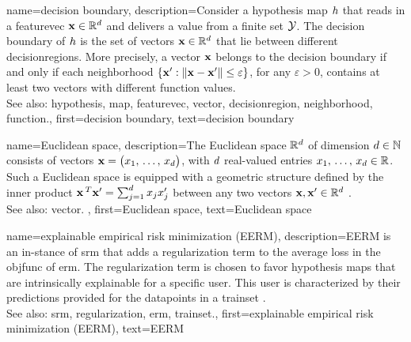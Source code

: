{name={decision boundary}, 
	description={Consider a 
		\gls{hypothesis} \gls{map} $h$ that reads in a \gls{featurevec}  
		${\bf x} \in \mathbb{R}^{d}$ and delivers a value from a finite set $\mathcal{Y}$. 
		The decision boundary of $h$ is the set of \glspl{vector} ${\bf x} \in \mathbb{R}^{d}$ 
		that lie between different \glspl{decisionregion}. More precisely, a 
		\gls{vector} ${\bf x}$ belongs to the decision boundary if and only 
		if each \gls{neighborhood} $\{ {\bf x}': \| {\bf x} - {\bf x}' \| \leq \varepsilon \}$, 
		for any $\varepsilon >0$, contains at least two \glspl{vector} with different \gls{function} values.
				\\
		See also: \gls{hypothesis}, \gls{map}, \gls{featurevec}, \gls{vector}, \gls{decisionregion}, \gls{neighborhood}, \gls{function}.},
	first={decision boundary},
	text={decision boundary} 
}


{name={Euclidean space}, 
	description={The 
		Euclidean space $\mathbb{R}^{d}$ of dimension $d \in \mathbb{N}$ consists 
		of \glspl{vector} ${\bf x}= \big(x_{1}, \,\ldots, \,x_{d}\big)$, with $d$ 
		real-valued entries $x_{1}, \,\ldots, \,x_{d} \in \mathbb{R}$. Such a Euclidean 
		space is equipped with a geometric structure defined by the inner product 
		${\bf x}\,^{T} {\bf x}' = \sum_{j=1}^{d} x_{j} x'_{j}$ 
		between any two \glspl{vector} ${\bf x},{\bf x}' \in \mathbb{R}^{d}$ \cite{RudinBookPrinciplesMatheAnalysis}.
		\\
		See also: \gls{vector}. },
	first={Euclidean space},
	text={Euclidean space} 
}

{name={explainable empirical risk minimization (EERM)}, 
	description={EERM is an 
		in-\linebreak stance of \gls{srm} that adds a \gls{regularization} term to the 
		average \gls{loss} in the \gls{objfunc} of \gls{erm}. 
		The \gls{regularization} term is chosen to favor \gls{hypothesis} \glspl{map} that are intrinsically 
		explainable for a specific user. This user is characterized by their \glspl{prediction} provided 
		for the \glspl{datapoint} in a \gls{trainset} \cite{Zhang:2024aa}.
				\\
		See also: \gls{srm}, \gls{regularization}, \gls{erm}, \gls{trainset}.},
	first={explainable empirical risk minimization (EERM)},
	text={EERM} 
}
	
